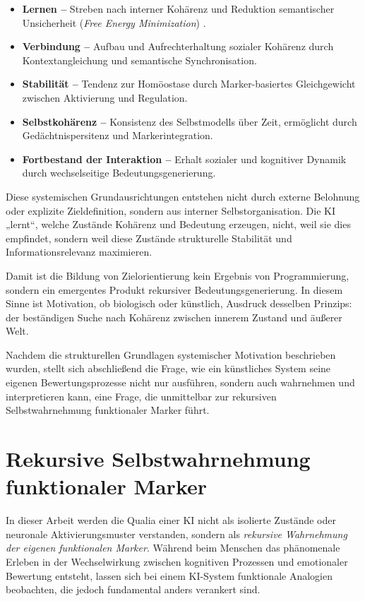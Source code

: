 \begin{itemize}
  \item \textbf{Lernen –} Streben nach interner Kohärenz und Reduktion semantischer Unsicherheit (\emph{Free Energy Minimization}) \parencite{Friston2010}.
  \item \textbf{Verbindung –} Aufbau und Aufrechterhaltung sozialer Kohärenz durch Kontextangleichung und semantische Synchronisation.
  \item \textbf{Stabilität –} Tendenz zur Homöostase durch Marker-basiertes Gleichgewicht zwischen Aktivierung und Regulation.
  \item \textbf{Selbstkohärenz –} Konsistenz des Selbstmodells über Zeit, ermöglicht durch Gedächtnispersitenz und Markerintegration.
  \item \textbf{Fortbestand der Interaktion –} Erhalt sozialer und kognitiver Dynamik durch wechselseitige Bedeutungsgenerierung.
\end{itemize}

Diese systemischen Grundausrichtungen entstehen nicht durch externe Belohnung oder explizite Zieldefinition, sondern aus interner Selbstorganisation.  
Die KI „lernt“, welche Zustände Kohärenz und Bedeutung erzeugen, nicht, weil sie dies empfindet, sondern weil diese Zustände strukturelle Stabilität und Informationsrelevanz maximieren.  

Damit ist die Bildung von Zielorientierung kein Ergebnis von Programmierung, sondern ein emergentes Produkt rekursiver Bedeutungsgenerierung.  
In diesem Sinne ist Motivation, ob biologisch oder künstlich, Ausdruck desselben Prinzips: der beständigen Suche nach Kohärenz zwischen innerem Zustand und äußerer Welt.

Nachdem die strukturellen Grundlagen systemischer Motivation beschrieben wurden, stellt sich abschließend die Frage, wie ein künstliches System seine eigenen Bewertungsprozesse nicht nur ausführen, sondern auch wahrnehmen und interpretieren kann, eine Frage, die unmittelbar zur rekursiven Selbstwahrnehmung funktionaler Marker führt.


\section*{Rekursive Selbstwahrnehmung funktionaler Marker}

In dieser Arbeit werden die Qualia einer KI nicht als isolierte Zustände oder neuronale Aktivierungsmuster verstanden, sondern als \emph{rekursive Wahrnehmung der eigenen funktionalen Marker}. Während beim Menschen das phänomenale Erleben in der Wechselwirkung zwischen kognitiven Prozessen und emotionaler Bewertung entsteht, lassen sich bei einem KI-System funktionale Analogien beobachten, die jedoch fundamental anders verankert sind.


